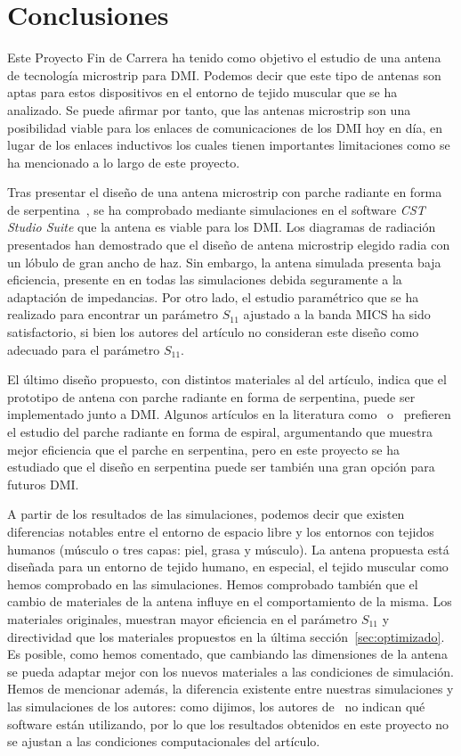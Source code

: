 \section{Conclusiones}

Este Proyecto Fin de Carrera ha tenido como objetivo el estudio de una antena de tecnología microstrip para DMI. Podemos decir que este tipo de antenas son aptas para estos dispositivos en el entorno de tejido muscular que se ha analizado. Se puede afirmar por tanto, que las antenas microstrip son una posibilidad viable para los enlaces de comunicaciones de los DMI hoy en día, en lugar de los enlaces inductivos los cuales tienen importantes limitaciones como se ha mencionado a lo largo de este proyecto.

Tras presentar el diseño de una antena microstrip con parche radiante en forma de serpentina~\cite{soont}, se ha comprobado mediante simulaciones en el software \textit{CST Studio Suite} que la antena es viable para los DMI. Los diagramas de radiación presentados han demostrado que el diseño de antena microstrip elegido radia con un lóbulo de gran ancho de haz. Sin embargo, la antena simulada presenta baja eficiencia, presente en en todas las simulaciones debida seguramente a la adaptación de impedancias. Por otro lado, el estudio paramétrico que se ha realizado para encontrar un parámetro $S_{11}$ ajustado a la banda MICS ha sido satisfactorio, si bien los autores del artículo no consideran este diseño como adecuado para el parámetro $S_{11}$.

El último diseño propuesto, con distintos materiales al del artículo, indica que el prototipo de antena con parche radiante en forma de serpentina, puede ser implementado junto a DMI. Algunos artículos en la literatura como~\cite{requena} o~\cite{kim} prefieren el estudio del parche radiante en forma de espiral, argumentando que muestra mejor eficiencia que el parche en serpentina, pero en este proyecto se ha estudiado que el diseño en serpentina puede ser también una gran opción para futuros DMI.

A partir de los resultados de las simulaciones, podemos decir que existen diferencias notables entre el entorno de espacio libre y los entornos con tejidos humanos (músculo o tres capas: piel, grasa y músculo). La antena propuesta está diseñada para un entorno de tejido humano, en especial, el tejido muscular como hemos comprobado en las simulaciones. Hemos comprobado también que el cambio de materiales de la antena influye en el comportamiento de la misma. Los materiales originales, muestran mayor eficiencia en el parámetro $S_{11}$ y directividad que los materiales propuestos en la última sección~\ref{sec:optimizado}. Es posible, como hemos comentado, que cambiando las dimensiones de la antena se pueda adaptar mejor con los nuevos materiales a las condiciones de simulación. Hemos de mencionar además, la diferencia existente entre nuestras simulaciones y las simulaciones de los autores: como dijimos, los autores de~\cite{soont} no indican qué software están utilizando, por lo que los resultados obtenidos en este proyecto no se ajustan a las condiciones computacionales del artículo.

